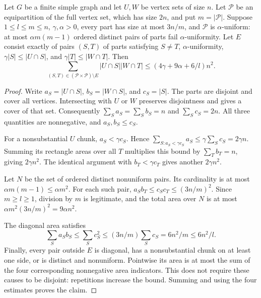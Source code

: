 \begin{lemma}
Let $G$ be a finite simple graph and let $U,W$ be vertex sets of size $n$.
Let $\mathcal P$ be an equipartition of the full vertex set, which has size
$2n$, and put $m=|\mathcal P|$. Suppose $1\leq l\leq m\leq n$,
$\gamma,\alpha>0$, every part has size at most $3n/m$, and
$\mathcal P$ is $\alpha$-uniform: at most $\alpha m(m-1)$ ordered
distinct pairs of parts fail $\alpha$-uniformity.
Let $E$ consist exactly of pairs $(S,T)$ of parts satisfying $S\ne T$,
$\alpha$-uniformity, $\gamma|S|\leq|U\cap S|$, and
$\gamma|T|\leq|W\cap T|$. Then
\[
 \sum_{(S,T)\in(\mathcal P\times\mathcal P)\setminus E}
 |U\cap S||W\cap T|
 \leq (4\gamma+9\alpha+6/l)n^2.
\]
\end{lemma}
\begin{proof}
Write $a_S=|U\cap S|$, $b_S=|W\cap S|$, and $c_S=|S|$.
The parts are disjoint and cover all vertices. Intersecting with $U$
or $W$ preserves disjointness and gives a cover of that set. Consequently
$\sum_S a_S=\sum_S b_S=n$ and $\sum_S c_S=2n$.
All three quantities are nonnegative, and $a_S,b_S\leq c_S$.

For a nonsubstantial $U$ chunk, $a_S<\gamma c_S$. Hence
$\sum_{S:a_S<\gamma c_S}a_S\leq\gamma\sum_S c_S=2\gamma n$.
Summing its rectangle areas over all $T$ multiplies this bound by
$\sum_T b_T=n$, giving $2\gamma n^2$. The identical argument with
$b_T<\gamma c_T$ gives another $2\gamma n^2$.

Let $N$ be the set of ordered distinct nonuniform pairs. Its cardinality
is at most $\alpha m(m-1)\leq\alpha m^2$. For each such pair,
$a_Sb_T\leq c_Sc_T\leq(3n/m)^2$. Since $m\geq l\geq1$,
division by $m$ is legitimate, and the total area over $N$ is at most
$\alpha m^2(3n/m)^2=9\alpha n^2$.

The diagonal area satisfies
\[
 \sum_S a_Sb_S\leq\sum_S c_S^2
 \leq (3n/m)\sum_S c_S=6n^2/m\leq6n^2/l.
\]
Finally, every pair outside $E$ is diagonal, has a nonsubstantial chunk
on at least one side, or is distinct and nonuniform. Pointwise its area
is at most the sum of the four corresponding nonnegative area indicators.
This does not require these causes to be disjoint: repetitions increase
the bound. Summing and using the four estimates proves the claim.
\end{proof}
